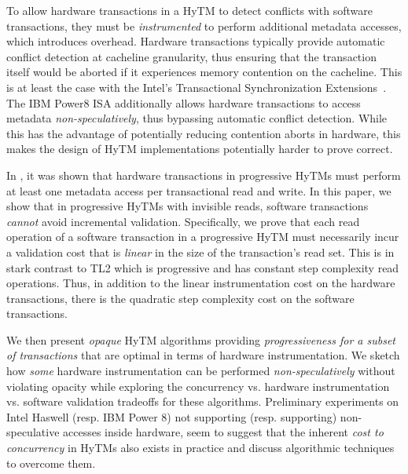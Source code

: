 To allow hardware transactions in a HyTM to detect conflicts with software transactions, they must be \emph{instrumented} to perform additional metadata accesses, which introduces overhead.
Hardware transactions typically provide automatic conflict detection at cacheline granularity,
thus ensuring that the transaction itself would be aborted if it experiences memory contention on the cacheline.
This is at least the case with the Intel's Transactional Synchronization Extensions~\cite{haswell}.
The IBM Power8 ISA additionally allows hardware transactions to access metadata \emph{non-speculatively}, 
thus bypassing automatic conflict detection. While this has the advantage of potentially reducing contention aborts
in hardware, this makes the design of HyTM implementations potentially harder to prove correct.

In \cite{htmdisc15}, it was shown that hardware transactions in progressive HyTMs must perform
at least one metadata access per transactional read and write.
In this paper, we show that in progressive HyTMs with invisible reads, 
software transactions \textit{cannot} avoid incremental validation.
Specifically, we prove that each read operation of a software transaction in a progressive HyTM
must necessarily incur a validation cost that is \emph{linear} 
in the size of the transaction's read set. 
This is in stark contrast to TL2 which is progressive and has constant step complexity read operations.
Thus, in addition to the linear instrumentation cost on the hardware transactions, there is the quadratic
step complexity cost on the software transactions.

We then present \emph{opaque} HyTM algorithms providing \emph{progressiveness for a subset of transactions} that are  %
optimal in terms of hardware instrumentation. We sketch 
how \emph{some} hardware instrumentation can be performed \textit{non-speculatively} 
without violating opacity while exploring the concurrency vs. hardware instrumentation vs. software validation
tradeoffs for these algorithms.
Preliminary experiments on Intel Haswell (resp. IBM Power 8) not supporting (resp. supporting) non-speculative accesses inside hardware,
seem to suggest that the inherent \emph{cost to concurrency} in HyTMs also exists in practice and discuss algorithmic techniques to overcome them.

%